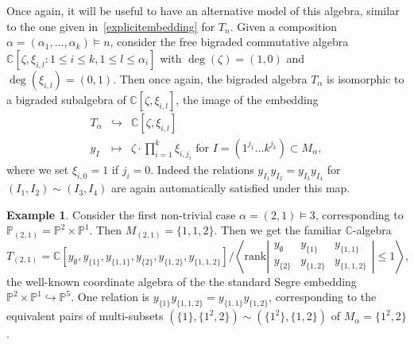 \documentclass[a4paper,11pt]{amsart}
\theoremstyle{plain}
\theoremstyle{definition}
\newtheorem{example}[theorem]{Example}
\newcommand{\C}{\mathbb{C}}
\newcommand{\pa}{T} %
\renewcommand{\P}{\mathbb{P}}
\begin{document}
Once again, it will be useful to have an alternative model of this algebra, similar to the one given in~\eqref{explicitembedding} for $T_n$. Given a composition $\alpha =(\alpha_1, \ldots, \alpha_k)\vDash n$, 
consider the free bigraded commutative algebra
$\C[\zeta,\xi_{i,l} \colon 1\leq i \leq k, 1\leq l \leq \alpha_i]$ with $\deg(\zeta) =(1,0)$ and $\deg(\xi_{i,l})=(0,1)$. Then once again, the bigraded algebra $T_\alpha$ is isomorphic to a bigraded subalgebra of 
$\C[\zeta,\xi_{i,l}]$, the image of the embedding
\begin{equation} \begin{array}{rcl} T_\alpha & \hookrightarrow & \C[\zeta, \xi_{i,l}]\\
y_{\scriptscriptstyle I}&\mapsto& \zeta\cdot \displaystyle\prod_{i=1}^k \xi_{i, j_i}  \mbox { for } I=(1^{j_1}\ldots k^{j_k})\subset M_\alpha,
\end{array}\label{generalexplicitembedding}
\end{equation}
where we set $\xi_{i,0}=1$ if $j_i=0$. 
Indeed the relations $y_{\scriptscriptstyle I_1} y_{\scriptscriptstyle I_2} = y_{\scriptscriptstyle I_3} y_{\scriptscriptstyle I_4}$ for $(I_1,I_2)\sim (I_3,I_4)$ are again automatically satisfied under this map.
\begin{example}\label{ex21_ring} Consider the first non-trivial case $\alpha=(2,1)\vDash 3$, corresponding to
$\P_{(2,1)}=\P^2\times\P^1$. Then 
$M_{(2,1)}=\{1,1,2\}$. Then we get the familiar $\C$-algebra
\[\pa_{(2,1)}  = \C[y_\emptyset,y_{\{1\}}, y_{\{1,1\}}, y_{\{2\}}, y_{\{1,2\}}, y_{\{1,1,2\}}]\Big/ \left\langle\mathrm{rank}\left|\begin{array}{ccc} y_\emptyset & y_{\{1\}} & y_{\{1,1\}} \\ y_{\{2\}} & y_{\{1,2\}}& y_{\{1,1,2\}} \end{array}\right|\leq 1\right\rangle,\]
the well-known coordinate algebra of the the standard Segre embedding $\P^2\times\P^1\hookrightarrow\P^5$. One relation is $y_{\{1\}}y_{\{1,1,2\}} = y_{\{1,1\}}y_{\{1,2\}}$, 
corresponding to the equivalent pairs of multi-subsets $(\{1\}, \{1^2, 2\})\sim (\{1^2\}, \{1,2\})$ of $M_\alpha=\{1^2,2\}$.
\end{example}
\end{document}
